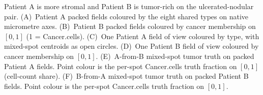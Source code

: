 Patient A is more stromal and Patient B is tumor-rich on the ulcerated-nodular pair. (A)~Patient A packed fields coloured by the eight shared types on native micrometre axes. (B)~Patient B packed fields coloured by cancer membership on \([0,1]\) (1 = Cancer.cells). (C)~One Patient A field of view coloured by type, with mixed-spot centroids as open circles. (D)~One Patient B field of view coloured by cancer membership on \([0,1]\). (E)~A-from-B mixed-spot tumor truth on packed Patient A fields. Point colour is the per-spot Cancer.cells truth fraction on \([0,1]\) (cell-count share). (F)~B-from-A mixed-spot tumor truth on packed Patient B fields. Point colour is the per-spot Cancer.cells truth fraction on \([0,1]\).
